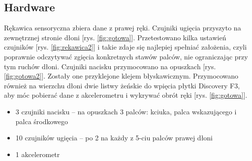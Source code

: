 \documentclass[12pt,a4paper]{article}
\begin{document}
\subsection{Hardware}
Rękawica sensoryczna zbiera dane z prawej ręki. Czujniki ugięcia przyszyto na zewnętrznej stronie dłoni [rys. \ref{fig:gotowa}].
 Przetestowano kilka ustawień czujników [rys. \ref{fig:rekawica2}] i takie zdaje się najlepiej spełniać założenia, czyli poprawnie odczytywać zgięcia konkretnych stawów palców, nie ograniczając przy tym ruchów dłoni. Czujniki nacisku przymocowano na opuszkach [rys. \ref{fig:gotowa2}]. Zostały one przyklejone klejem błyskawicznym. Przymocowano również na wierzchu dłoni dwie listwy żeńskie do wpięcia płytki Discovery F3, aby móc pobierać dane z akcelerometru i wykrywać obrót ręki [rys. \ref{fig:gotowa}].
\begin{itemize}
\item 3 czujniki nacisku -- na opuszkach 3 palców: kciuka, palca wskazującego i palca środkowego
\item 10 czujników ugięcia -- po 2 na każdy z 5-ciu palców prawej dłoni
\item 1 akcelerometr
\end{itemize}
\end{document}
